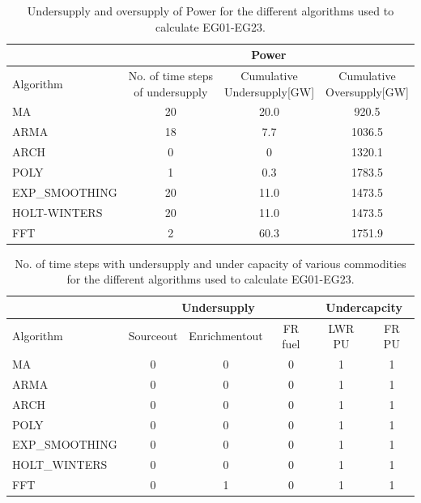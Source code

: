 \documentclass[11pt,letterpaper]{article}
\begin{document}
\begin{table}[]
	\centering
	\caption {Undersupply and oversupply of Power for the different algorithms used to calculate EG01-EG23.}
	\label{tab:23-power}
	\begin{tabular}{|l|c|c|c|}
		\hline
		& \multicolumn{3}{c|}{Power} \\ \hline
		Algorithm & \shortstack{No. of time steps\\of undersupply}  & 
		\shortstack{Cumulative\\Undersupply[GW]}  & \shortstack{Cumulative\\Oversupply[GW]} \\ \hline
		MA        & 20 	& 20.0  &  920.5   \\ \hline
		ARMA      & 18 	&  7.7  &  1036.5  \\ \hline
		ARCH      &  0 	&   0  	&  1320.1  \\ \hline
		POLY      &  1 	&  0.3 	&  1783.5  \\ \hline
		EXP\_SMOOTHING 	& 20 	& 11.0 & 1473.5 \\ \hline
		HOLT-WINTERS  	& 20 	& 11.0 & 1473.5 \\ \hline
		FFT       & 2 	& 60.3 	& 1751.9 	\\ \hline
	\end{tabular}
\end{table}

\begin{table}[]
	\centering
	\caption {No. of time steps with undersupply and under capacity of various commodities for the different algorithms used to calculate EG01-EG23.}
	\label{tab:23-commod}
	\begin{tabular}{|l|c|c|c|c|c|}
		\hline
		& \multicolumn{3}{c|}{Undersupply} & \multicolumn{2}{c|}{Undercapcity} \\ \hline
		Algorithm & Sourceout & Enrichmentout & FR fuel & LWR PU & FR PU \\ \hline
		MA        & 0 & 0 & 0 & 1 & 1 \\ \hline
		ARMA      & 0 & 0 & 0 & 1 & 1 \\ \hline
		ARCH      & 0 & 0 & 0 & 1 & 1 \\ \hline
		POLY      & 0 & 0 & 0 & 1 & 1 \\ \hline
		EXP\_SMOOTHING & 0 & 0 & 0 & 1 & 1 \\ \hline
		HOLT\_WINTERS  & 0 & 0 & 0 & 1 & 1 \\ \hline
		FFT       & 0 & 1 & 0 & 1 & 1 \\ \hline
	\end{tabular}
\end{table}
\end{document}
